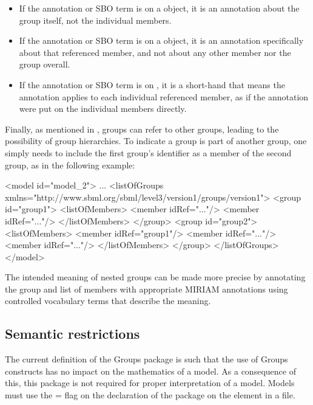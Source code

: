 \begin{itemize}

\item If the annotation or SBO term is on a \Group object, it is an annotation about the group itself, not the individual members.

\item If the annotation or SBO term is on a \Member object, it is an annotation specifically about that referenced member, and not about any other member nor the group overall.

\item If the annotation or SBO term is on \ListOfMembers, it is a short-hand that means the annotation applies to each individual referenced member, as if the annotation were put on the individual members directly.

\end{itemize}

Finally, as mentioned in , groups can refer to other groups, leading to the possibility of group hierarchies. To indicate a group is part of another group, one simply needs to include the first group's identifier as a member of the second group, as in the following example:

\clearpage

\begin{example}
<model id="model_2"> 
  ... 
  <listOfGroups xmlns="http://www.sbml.org/sbml/level3/version1/groups/version1"> 
    <group id="group1"> 
      <listOfMembers> 
        <member idRef="..."/> 
        <member idRef="..."/> 
      </listOfMembers> 
    </group> 
    <group id="group2"> 
      <listOfMembers> 
        <member idRef="group1"/> 
        <member idRef="..."/> 
        <member idRef="..."/> 
      </listOfMembers> 
    </group> 
  </listOfGroups> 
</model> 
\end{example}

The intended meaning of nested groups can be made more precise by annotating the group and list of members with appropriate MIRIAM annotations using controlled vocabulary terms that describe the meaning.


\subsection{Semantic restrictions}
\label{semantic-restrictions}

The current definition of the Groups package is such that the use of Groups constructs has no impact on the mathematics of a model.  As a consequence of this, this package is not required for proper interpretation of a model. Models must use the = flag on the declaration of the package on the  element in a file.

